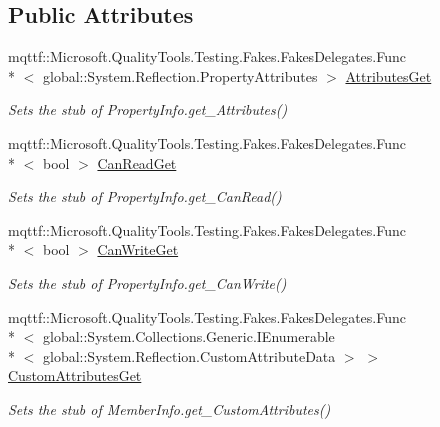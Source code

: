 \subsection*{Public Attributes}
\begin{DoxyCompactItemize}
\item 
mqttf\-::\-Microsoft.\-Quality\-Tools.\-Testing.\-Fakes.\-Fakes\-Delegates.\-Func\\*
$<$ global\-::\-System.\-Reflection.\-Property\-Attributes $>$ \hyperlink{class_system_1_1_reflection_1_1_fakes_1_1_stub_property_info_a2d31fec4273a1345d6137e4b1187ae50}{Attributes\-Get}
\begin{DoxyCompactList}\small\item\em Sets the stub of Property\-Info.\-get\-\_\-\-Attributes()\end{DoxyCompactList}\item 
mqttf\-::\-Microsoft.\-Quality\-Tools.\-Testing.\-Fakes.\-Fakes\-Delegates.\-Func\\*
$<$ bool $>$ \hyperlink{class_system_1_1_reflection_1_1_fakes_1_1_stub_property_info_aa3edc29dc9f728b41cdc871ca7819809}{Can\-Read\-Get}
\begin{DoxyCompactList}\small\item\em Sets the stub of Property\-Info.\-get\-\_\-\-Can\-Read()\end{DoxyCompactList}\item 
mqttf\-::\-Microsoft.\-Quality\-Tools.\-Testing.\-Fakes.\-Fakes\-Delegates.\-Func\\*
$<$ bool $>$ \hyperlink{class_system_1_1_reflection_1_1_fakes_1_1_stub_property_info_a8d756942cb6f63843452570a2b99b5b2}{Can\-Write\-Get}
\begin{DoxyCompactList}\small\item\em Sets the stub of Property\-Info.\-get\-\_\-\-Can\-Write()\end{DoxyCompactList}\item 
mqttf\-::\-Microsoft.\-Quality\-Tools.\-Testing.\-Fakes.\-Fakes\-Delegates.\-Func\\*
$<$ global\-::\-System.\-Collections.\-Generic.\-I\-Enumerable\\*
$<$ global\-::\-System.\-Reflection.\-Custom\-Attribute\-Data $>$ $>$ \hyperlink{class_system_1_1_reflection_1_1_fakes_1_1_stub_property_info_af2c8602d78be31a7b31f1b18b87874fa}{Custom\-Attributes\-Get}
\begin{DoxyCompactList}\small\item\em Sets the stub of Member\-Info.\-get\-\_\-\-Custom\-Attributes()\end{DoxyCompactList}\item 

\end{DoxyCompactItemize}
